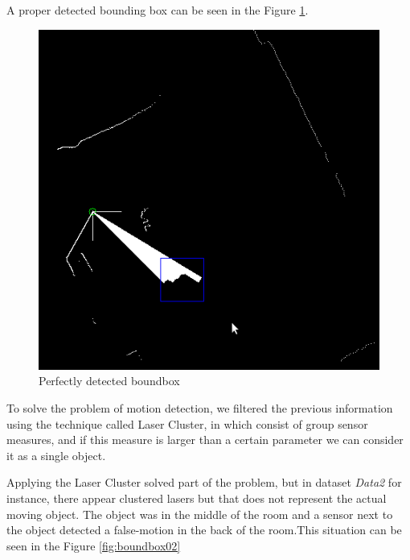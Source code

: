 \documentclass{article}
\begin{document}
A proper detected bounding box can be seen in the Figure \ref{fig:boundbox01}.

\begin{figure}[H]
\includegraphics[scale=0.6]{image/boundbox01}
\caption{Perfectly detected boundbox}
\label{fig:boundbox01}
\end{figure}

To solve the problem of motion detection, we filtered the previous information using the technique called Laser Cluster, in which consist of group sensor measures, and if this measure is larger than a certain parameter we can consider it as a single object. 

Applying the Laser Cluster solved part of the problem, but in dataset \emph{Data2} for instance, there appear clustered lasers but that does not represent the actual moving object. The object was in the middle of the room and a sensor next to the object detected a false-motion in the back of the room.This situation can be seen in the Figure \ref{fig:boundbox02}
\end{document}

